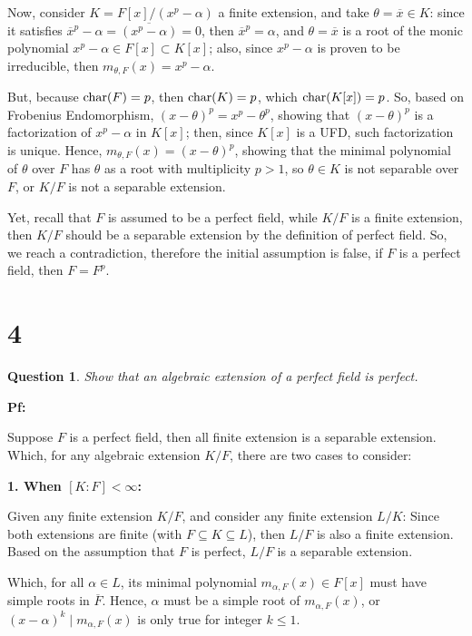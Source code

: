 \documentclass{article}
\newtheorem{question}{Question}
\begin{document}
\hfil

Now, consider $K=F[x]/(x^p-\alpha)$ a finite extension, and take $\theta=\overline{x}\in K$: since it satisfies $\overline{x}^p-\alpha = \overline{(x^p-\alpha)}=0$, then $\overline{x}^p=\alpha$, and $\theta = \overline{x}$ is a root of the monic polynomial $x^p-\alpha\in F[x]\subset K[x]$; also, since $x^p-\alpha$ is proven to be irreducible, then $m_{\theta,F}(x)=x^p-\alpha$.

But, because $\textmd{char}(F)=p$, then $\textmd{char}(K)=p$, which $\textmd{char}(K[x])=p$. So, based on Frobenius Endomorphism, $(x-\theta)^p = x^p-\theta^p$, showing that $(x-\theta)^p$ is a factorization of $x^p-\alpha$ in $K[x]$; then, since $K[x]$ is a UFD, such factorization is unique. Hence, $m_{\theta,F}(x) = (x-\theta)^p$, showing that the minimal polynomial of $\theta$ over $F$ has $\theta$ as a root with multiplicity $p>1$, so $\theta\in K$ is not separable over $F$, or $K/F$ is not a separable extension.

Yet, recall that $F$ is assumed to be a perfect field, while $K/F$ is a finite extension, then $K/F$ should be a separable extension by the definition of perfect field. So, we reach a contradiction, therefore the initial assumption is false, if $F$ is a perfect field, then $F=F^p$.

\break

\section*{4}
\begin{myBox}[]{}
    \begin{question}
        Show that an algebraic extension of a perfect field is perfect.
    \end{question}
\end{myBox}

\textbf{Pf:}

Suppose $F$ is a perfect field, then all finite extension is a separable extension. Which, for any algebraic extension $K/F$, there are two cases to consider:

\hfil

\textbf{1. When $[K:F]<\infty$:}

Given any finite extension $K/F$, and consider any finite extension $L/K$: Since both extensions are finite (with $F\subseteq K\subseteq L$), then $L/F$ is also a finite extension. Based on the assumption that $F$ is perfect, $L/F$ is a separable extension.

Which, for all $\alpha\in L$, its minimal polynomial $m_{\alpha,F}(x)\in F[x]$ must have simple roots in $\overline{F}$. Hence, $\alpha$ must be a simple root of $m_{\alpha,F}(x)$, or $(x-\alpha)^k\mid m_{\alpha,F}(x)$ is only true for integer $k\leq 1$.
\end{document}

